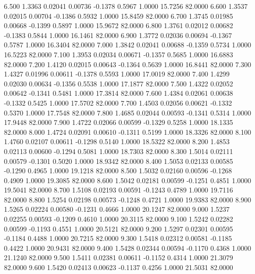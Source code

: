    6.500   1.3363   0.02041   0.00736  -0.1378   0.5967   1.0000  15.7256  82.0000
   6.600   1.3537   0.02015   0.00704  -0.1386   0.5932   1.0000  15.8459  82.0000
   6.700   1.3745   0.01985   0.00668  -0.1399   0.5897   1.0000  15.9672  82.0000
   6.800   1.3761   0.02012   0.00682  -0.1383   0.5844   1.0000  16.1461  82.0000
   6.900   1.3772   0.02036   0.00694  -0.1367   0.5787   1.0000  16.3404  82.0000
   7.000   1.3842   0.02041   0.00688  -0.1359   0.5734   1.0000  16.5223  82.0000
   7.100   1.3953   0.02034   0.00671  -0.1357   0.5685   1.0000  16.6883  82.0000
   7.200   1.4120   0.02015   0.00643  -0.1364   0.5639   1.0000  16.8441  82.0000
   7.300   1.4327   0.01996   0.00611  -0.1378   0.5593   1.0000  17.0019  82.0000
   7.400   1.4299   0.02030   0.00634  -0.1356   0.5538   1.0000  17.1877  82.0000
   7.500   1.4322   0.02052   0.00642  -0.1341   0.5481   1.0000  17.3814  82.0000
   7.600   1.4384   0.02061   0.00638  -0.1332   0.5425   1.0000  17.5702  82.0000
   7.700   1.4503   0.02056   0.00621  -0.1332   0.5370   1.0000  17.7548  82.0000
   7.800   1.4685   0.02044   0.00593  -0.1341   0.5314   1.0000  17.9448  82.0000
   7.900   1.4722   0.02066   0.00599  -0.1329   0.5258   1.0000  18.1335  82.0000
   8.000   1.4724   0.02091   0.00610  -0.1311   0.5199   1.0000  18.3326  82.0000
   8.100   1.4760   0.02107   0.00611  -0.1298   0.5140   1.0000  18.5322  82.0000
   8.200   1.4853   0.02113   0.00600  -0.1294   0.5081   1.0000  18.7303  82.0000
   8.300   1.5014   0.02111   0.00579  -0.1301   0.5020   1.0000  18.9342  82.0000
   8.400   1.5053   0.02133   0.00585  -0.1290   0.4965   1.0000  19.1218  82.0000
   8.500   1.5032   0.02160   0.00596  -0.1268   0.4909   1.0000  19.3085  82.0000
   8.600   1.5042   0.02181   0.00599  -0.1251   0.4851   1.0000  19.5041  82.0000
   8.700   1.5108   0.02193   0.00591  -0.1243   0.4789   1.0000  19.7116  82.0000
   8.800   1.5254   0.02198   0.00573  -0.1248   0.4721   1.0000  19.9383  82.0000
   8.900   1.5265   0.02224   0.00580  -0.1231   0.4666   1.0000  20.1247  82.0000
   9.000   1.5237   0.02255   0.00593  -0.1209   0.4610   1.0000  20.3115  82.0000
   9.100   1.5242   0.02282   0.00599  -0.1193   0.4551   1.0000  20.5121  82.0000
   9.200   1.5297   0.02301   0.00595  -0.1184   0.4488   1.0000  20.7215  82.0000
   9.300   1.5418   0.02312   0.00581  -0.1185   0.4422   1.0000  20.9431  82.0000
   9.400   1.5428   0.02344   0.00594  -0.1170   0.4368   1.0000  21.1240  82.0000
   9.500   1.5411   0.02381   0.00611  -0.1152   0.4314   1.0000  21.3079  82.0000
   9.600   1.5420   0.02413   0.00623  -0.1137   0.4256   1.0000  21.5031  82.0000
